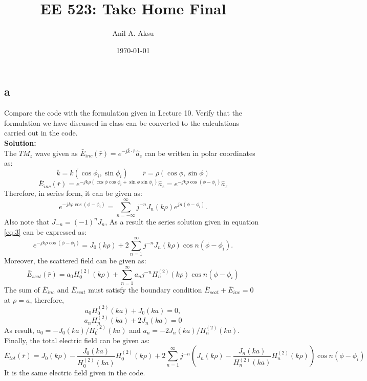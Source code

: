 \documentclass[11pt]{amsart}
\title{EE 523: Take Home Final}
\author{Anil A. Aksu}
\date{\today}
\begin{document}
\maketitle

\subsection*{a}
Compare the code with the formulation given in Lecture 10. Verify that the formulation we have discussed in class can be converted to the calculations carried out in the code.
\\
\textbf{Solution:}\\
The $TM_z$ wave given as $\bar{E}_{inc}(\bar{r})=e^{-j\bar{k}\cdot \bar{r}}\hat{a}_z$ can be written in  polar coordinates as:
\begin{equation}
\bar{k}=k(\cos \phi_i, \sin \phi_i) \qquad \bar{r}=\rho(\cos \phi, \sin \phi)
\end{equation}
\begin{equation}
\label{eq:2}
\bar{E}_{inc}(\bar{r})=e^{-j k \rho (\cos \phi \cos\phi_i + \sin \phi \sin \phi_i) }\hat{a}_z=e^{-j k \rho \cos (\phi-\phi_i) }\hat{a}_z
\end{equation}
Therefore, in series form, it can be given as:
\begin{equation}
\label{eq:3}
e^{-j k \rho \cos (\phi-\phi_i) }=\sum_{n=-\infty}^{\infty}j^{-n}J_n(k \rho)e^{jn(\phi-\phi_i)}.
\end{equation}
Also note that $J_{-n}=(-1)^n J_n$, As a result the series solution given in equation \ref{eq:3} can be expressed as:
\begin{equation}
\label{eq:4}
e^{-j k \rho \cos (\phi-\phi_i) }=J_0(k \rho)+2\sum_{n=1}^{\infty}j^{-n}J_n(k \rho)\cos n(\phi-\phi_i).
\end{equation}
Moreover, the scattered field can be given as:
\begin{equation}
\label{eq:5}
\bar{E}_{scat}(\bar{r})= a_0 H^{(2)}_{0}(k \rho)+\sum_{n=1}^{\infty}a_n j^{-n}H^{(2)}_{n}(k \rho)\cos n(\phi-\phi_i)
\end{equation}
The sum of $\bar{E}_{inc}$ and $\bar{E}_{scat}$ must satisfy the boundary condition $\bar{E}_{scat}+\bar{E}_{inc}=0$ at $\rho=a$, therefore,
\begin{equation}
\label{eq:6}
a_0 H^{(2)}_{0}(k a)+J_0(k a)=0,
\end{equation}
\begin{equation}
\label{eq:7}
a_n H^{(2)}_{n}(k a)+2J_n(k a)=0
\end{equation}
As result, $a_0=-J_0(k a)/H^{(2)}_{0}(k a)$ and $a_n=-2J_n(k a)/H^{(2)}_{n}(k a)$. Finally, the total electric field can be given as:
\begin{equation}
\label{eq:8}
\bar{E}_{tot}(\bar{r})=J_0(k \rho)-\frac{J_0(k a)}{H^{(2)}_{0}(k a)} H^{(2)}_{0}(k \rho)+2\sum_{n=1}^{\infty}j^{-n}(J_n(k \rho)-\frac{J_n(k a)}{H^{(2)}_{n}(k a)}H^{(2)}_{n}(k \rho))\cos n(\phi-\phi_i)
\end{equation}
It is the same electric field given in the code.
\end{document}
